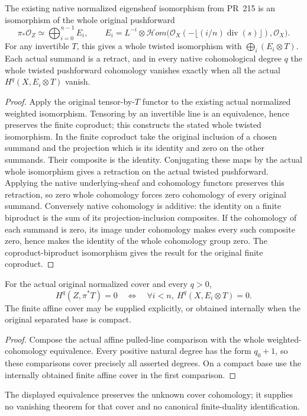 \begin{lemma}
\label{lem:kn-normalized-weighted-cohomology}
\leanok
{}
The existing native normalized eigensheaf isomorphism from PR~215
is an isomorphism of the whole original pushforward
\[
 \pi_*\mathcal O_Z\simeq\bigoplus_{i=0}^{n-1}E_i,
 \qquad
 E_i=L^{-i}\otimes
 \mathcal Hom\bigl(\mathcal O_X(-\lfloor(i/n)\operatorname{div}(s)\rfloor),
                   \mathcal O_X\bigr).
\]
For any invertible $T$, this gives a whole twisted isomorphism with
$\bigoplus_i(E_i\otimes T)$.  Each actual summand is a retract, and
in every native cohomological degree $q$ the whole twisted
pushforward cohomology vanishes exactly when all the actual
$H^q(X,E_i\otimes T)$ vanish.
\end{lemma}
\begin{proof}
Apply the original tensor-by-$T$ functor to the existing actual
normalized weighted isomorphism.  Tensoring by an invertible line
is an equivalence, hence preserves the finite coproduct; this
constructs the stated whole twisted isomorphism.  In the finite
coproduct take the original inclusion of a chosen summand and the
projection which is its identity and zero on the other summands.
Their composite is the identity.  Conjugating these maps by the
actual whole isomorphism gives a retraction on the actual twisted
pushforward.  Applying the native underlying-sheaf and cohomology
functors preserves this retraction, so zero whole cohomology forces
zero cohomology of every original summand.  Conversely native
cohomology is additive: the identity on a finite biproduct is the
sum of its projection-inclusion composites.  If the cohomology of
each summand is zero, its image under cohomology makes every such
composite zero, hence makes the identity of the whole cohomology
group zero.  The coproduct-biproduct isomorphism gives the result
for the original finite coproduct.
\end{proof}

\begin{theorem}
\label{thm:kn-normalized-positive-cohomology}
\leanok
{}
For the actual original normalized cover and every $q>0$,
\[
 H^q(Z,\pi^*T)=0
 \quad\Longleftrightarrow\quad
 \forall i<n,\ H^q(X,E_i\otimes T)=0.
\]
The finite affine cover may be supplied explicitly, or obtained
internally when the original separated base is compact.
\end{theorem}
\begin{proof}
Compose the actual affine pulled-line comparison with the whole
weighted-cohomology equivalence.  Every positive natural degree has
the form $q_0+1$, so these comparisons cover precisely all asserted
degrees.  On a compact base use the internally obtained finite
affine cover in the first comparison.
\end{proof}

The displayed equivalence preserves the unknown cover cohomology;
it supplies no vanishing theorem for that cover and no canonical
finite-duality identification.
